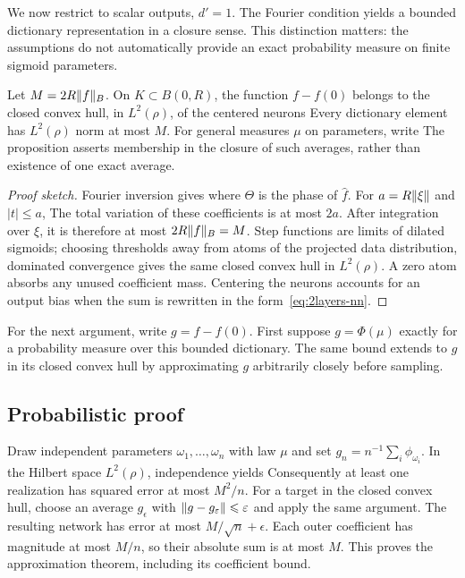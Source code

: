 We now restrict to scalar outputs, $d'=1$.
%
The Fourier condition yields a bounded dictionary representation in a closure sense. This distinction matters: the assumptions do not automatically provide an exact probability measure on finite sigmoid parameters.

\begin{prop}\label{prop-barron-closure}
Let $M=2R\lVert f\rVert_B$. On $K\subset B(0,R)$, the function $f-f(0)$ belongs to the closed convex hull, in $L^2(\rho)$, of the centered neurons
Every dictionary element has $L^2(\rho)$ norm at most $M$. For general measures $\mu$ on parameters, write
The proposition asserts membership in the closure of such averages, rather than existence of one exact average.
\end{prop}
\begin{proof}[Proof sketch]
Fourier inversion gives
where $\Theta$ is the phase of $\hat f$. For $a=R\lVert\xi\rVert$ and $|t|\leq a$,
The total variation of these coefficients is at most $2a$. After integration over $\xi$, it is therefore at most $2R\lVert f\rVert_B=M$. Step functions are limits of dilated sigmoids; choosing thresholds away from atoms of the projected data distribution, dominated convergence gives the same closed convex hull in $L^2(\rho)$. A zero atom absorbs any unused coefficient mass. Centering the neurons accounts for an output bias when the sum is rewritten in the form~\eqref{eq:2layers-nn}.
\end{proof}

For the next argument, write $g=f-f(0)$. First suppose $g=\Phi(\mu)$ exactly for a probability measure over this bounded dictionary. The same bound extends to $g$ in its closed convex hull by approximating $g$ arbitrarily closely before sampling.

\subsection{Probabilistic proof}

Draw independent parameters $\omega_1,\ldots,\omega_n$ with law $\mu$ and set $g_n=n^{-1}\sum_i\phi_{\omega_i}$. In the Hilbert space $L^2(\rho)$, independence yields
Consequently at least one realization has squared error at most $M^2/n$. For a target in the closed convex hull, choose an average $g_\epsilon$ with $\lVert g-g_\varepsilon\rVert\leqslant\varepsilon$ and apply the same argument. The resulting network has error at most $M/\sqrt n+\epsilon$. Each outer coefficient has magnitude at most $M/n$, so their absolute sum is at most $M$. This proves the approximation theorem, including its coefficient bound.

